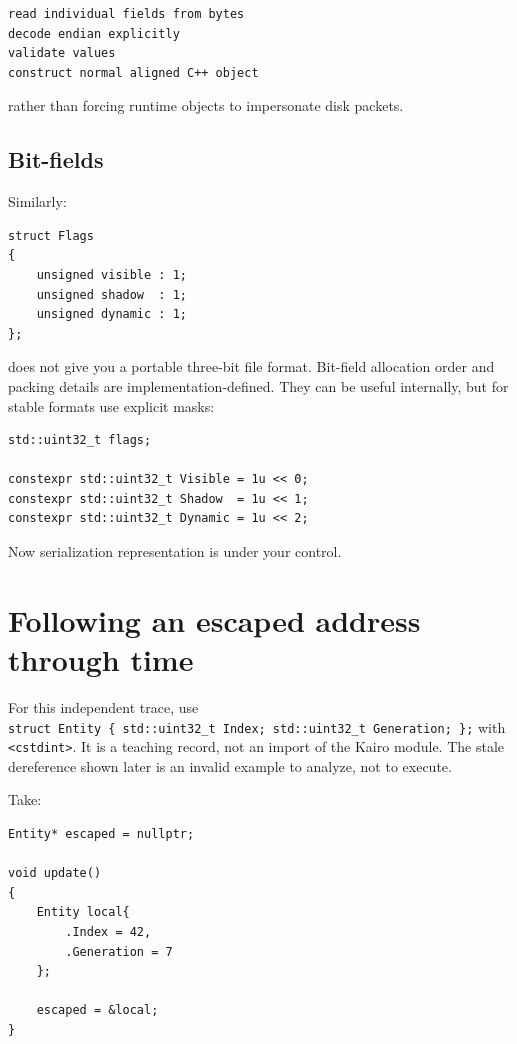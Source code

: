 \begin{verbatim}
read individual fields from bytes
decode endian explicitly
validate values
construct normal aligned C++ object
\end{verbatim}

rather than forcing runtime objects to impersonate disk packets.

\subsection{Bit-fields}\label{05-engine-i-ch003-bit-fields}

Similarly:

\begin{verbatim}
struct Flags
{
    unsigned visible : 1;
    unsigned shadow  : 1;
    unsigned dynamic : 1;
};
\end{verbatim}

does not give you a portable three-bit file format. Bit-field allocation order and packing details are implementation-defined. They can be useful internally, but for stable formats use explicit masks:

\begin{verbatim}
std::uint32_t flags;

constexpr std::uint32_t Visible = 1u << 0;
constexpr std::uint32_t Shadow  = 1u << 1;
constexpr std::uint32_t Dynamic = 1u << 2;
\end{verbatim}

Now serialization representation is under your control.

\section{Following an escaped address through time}\label{05-engine-i-ch003-following-an-escaped-address-through-time}

For this independent trace, use \texttt{struct\ Entity\ \{\ std::uint32\_t\ Index;\ std::uint32\_t\ Generation;\ \};} with \texttt{\textless{}cstdint\textgreater{}}. It is a teaching record, not an import of the Kairo module. The stale dereference shown later is an invalid example to analyze, not to execute.

Take:

\begin{verbatim}
Entity* escaped = nullptr;

void update()
{
    Entity local{
        .Index = 42,
        .Generation = 7
    };

    escaped = &local;
}
\end{verbatim}

